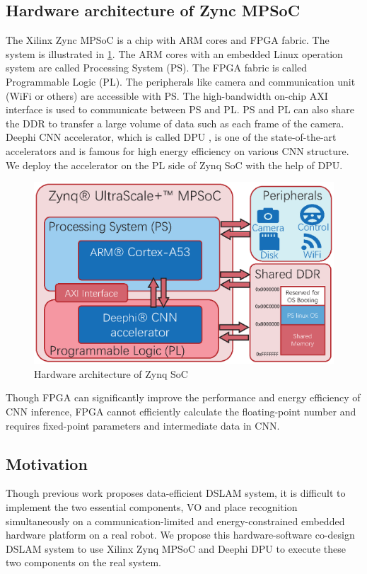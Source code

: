\subsection{Hardware architecture of Zync MPSoC}
The Xilinx Zync MPSoC is a chip with ARM cores and FPGA fabric. The system is illustrated in \cref{fig:plps}. The ARM cores with an embedded Linux operation system are called Processing System (PS). The FPGA fabric is called Programmable Logic (PL). The peripherals like camera and communication unit (WiFi or others) are accessible with PS. The high-bandwidth on-chip AXI interface is used to communicate between PS and PL. PS and PL can also share the DDR to transfer a large volume of data such as each frame of the camera.
Deephi CNN accelerator, which is called DPU \cite{Tech:2019360}, is one of the state-of-the-art accelerators and is famous for high energy efficiency on various CNN structure. We deploy the accelerator on the PL side of Zynq SoC with the help of DPU.

\begin{figure}[t]  
    \centering  
    \includegraphics[width=0.95\linewidth]{fig/plps.eps}
    \caption{Hardware architecture of Zynq SoC}
    \label{fig:plps}
\end{figure}

Though FPGA can significantly improve the performance and energy efficiency of CNN inference, FPGA cannot efficiently calculate the floating-point number and requires fixed-point parameters and intermediate data in CNN.

\subsection{Motivation}
Though previous work \cite{Cieslewski:20187ee} proposes data-efficient DSLAM system, it is difficult to implement the two essential components, VO and place recognition simultaneously on a communication-limited and energy-constrained embedded hardware platform on a real robot. We propose this hardware-software co-design DSLAM system to use Xilinx Zynq MPSoC and Deephi DPU to execute these two components on the real system.

